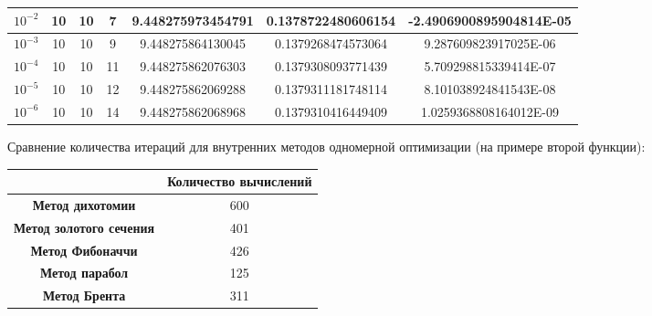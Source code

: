 \documentclass[12pt]{article}
\begin{document}
\begin{table}[H]
\begin{tabular}{|c|c|c|c|c|c|c|}
$10^{-2}$ & 10 & 10 & 7    & 9.448275973454791   & 0.1378722480606154  & -2.4906900895904814E-05 \\ \hline
$10^{-3}$ & 10 & 10 & 9    & 9.448275864130045   & 0.1379268474573064  & 9.287609823917025E-06   \\ \hline
$10^{-4}$ & 10 & 10 & 11   & 9.448275862076303   & 0.1379308093771439  & 5.709298815339414E-07   \\ \hline
$10^{-5}$ & 10 & 10 & 12   & 9.448275862069288   & 0.1379311181748114  & 8.101038924841543E-08   \\ \hline
$10^{-6}$ & 10 & 10 & 14   & 9.448275862068968   & 0.1379310416449409  & 1.0259368808164012E-09  \\ \hline
\end{tabular}
\end{table}

Сравнение количества итераций для внутренних методов одномерной оптимизации (на примере второй функции):

\begin{table}[h]
\centering
\begin{tabular}{|
>{\columncolor[HTML]{EED9C4}}c |c|}
\hline
\cellcolor[HTML]{EDE9E2}\textbf{} & \cellcolor[HTML]{FFF0DB}\textbf{Количество вычислений} \\ \hline
\textbf{Метод дихотомии}        & 600 \\ \hline
\textbf{Метод золотого сечения} & 401 \\ \hline
\textbf{Метод Фибоначчи}        & 426 \\ \hline
\textbf{Метод парабол}          & 125 \\ \hline
\textbf{Метод Брента}           & 311 \\ \hline
\end{tabular}
\end{table}
\end{document}
